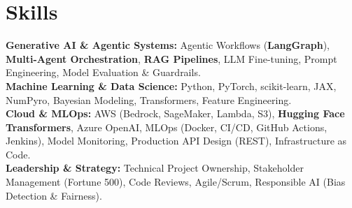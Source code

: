 \section{Skills}
\textbf{Generative AI \& Agentic Systems:} Agentic Workflows (\textbf{LangGraph}), \textbf{Multi-Agent Orchestration}, \textbf{RAG Pipelines}, LLM Fine-tuning, Prompt Engineering, Model Evaluation \& Guardrails.\\
\textbf{Machine Learning \& Data Science:} Python, PyTorch, scikit-learn, JAX, NumPyro, Bayesian Modeling, Transformers, Feature Engineering.\\
\textbf{Cloud \& MLOps:} AWS (Bedrock, SageMaker, Lambda, S3), \textbf{Hugging Face Transformers}, Azure OpenAI, MLOps (Docker, CI/CD, GitHub Actions, Jenkins), Model Monitoring, Production API Design (REST), Infrastructure as Code.\\
\textbf{Leadership \& Strategy:} Technical Project Ownership, Stakeholder Management (Fortune 500), Code Reviews, Agile/Scrum, Responsible AI (Bias Detection \& Fairness).